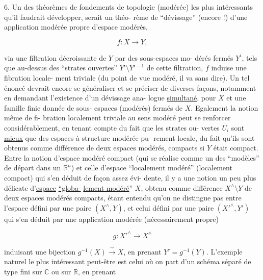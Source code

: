 
6. Un des théorèmes de fondements de topologie (modérée)
les plus intéressants qu'il faudrait développer, serait un théo-%
rème de ``dévissage'' (encore !) d'une application modérée propre
d'espace modérés,

\[ f : X \longrightarrow Y , \]

via une filtration décroissante de $Y$ par des sous-espaces mo-%
dérés fermés $Y^{i}$, tels que au-dessus des ``strates ouvertes''
$Y^{i} \setminus Y^{i-1}$ de cette filtration, $f$ induise une fibration locale-%
ment triviale (du point de vue modéré, il va sans dire). Un tel
énoncé devrait encore se généraliser et se préciser de diverses
façons, notamment en demandant l'existence d'un dévissage ana-%
logue \uline{simultané}, pour $X$ et une famille finie donnée de sous-%
espaces (modérés) fermés de $X$. Egalement la notion même de fi-%
bration localement triviale au sens modéré peut se renforcer
considérablement, en tenant compte du fait que les strates ou-%
vertes $U_{i}$ sont \uline{mieux} que des espaces à structure modérée pu-%
rement locale, du fait qu'ils sont obtenus comme différence de
deux espaces modérés, compacts si $Y$ était compact. Entre la
notion d'espace modéré compact (qui se réalise comme un des
``modèles'' de départ dans un $\mathbb{R}^{n}$) et celle d'espace ``localement
modéré'' (localement compact) qui s'en déduit de façon assez évi-%
dente, il y a une notion un peu plus délicate d'\uline{espace} \uline{``globa-}%
\uline{lement modéré}'' $X$, obtenu comme différence $X^{\wedge}\setminus Y$ de deux espaces
modérés compacts, étant entendu qu'on ne distingue pas entre
l'espace défini par une paire $(X^{\wedge},Y)$, et celui défini par une
paire $(X'^{\wedge},Y')$ qui s'en déduit par une application modérée
(nécessairement propre)

\[ g : X'^{\wedge} \longrightarrow X^{\wedge} \]

induisant une bijection $g^{-1}(X) \xrightarrow{\ \sim\ } X$, en prenant $Y' = g^{-1}(Y)$.
L'exemple naturel le plus intéressant peut-être est celui où on
part d'un schéma séparé de type fini sur $\mathbb{C}$ ou sur $\mathbb{R}$, en prenant

